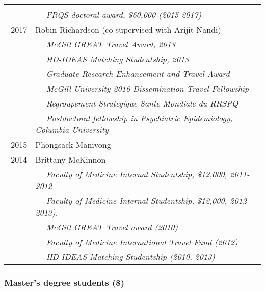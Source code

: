 \documentclass[
  letterpaper,
  DIV=11,
  numbers=noendperiod]{scrartcl}
\begin{document}
\begin{longtable}[]{@{}
  >{\raggedright\arraybackslash}p{}
  >{\raggedright\arraybackslash}p{}@{}}
{\$21,000} \\
& ~~ \emph{FRQS doctoral award, \$60,000 (2015-2017)} \\
2013-2017 & Robin Richardson (co-supervised with Arijit Nandi) \\
& ~~ \emph{McGill GREAT Travel Award, 2013} \\
& ~~ \emph{HD-IDEAS Matching Studentship, 2013} \\
& ~~ \emph{Graduate Research Enhancement and Travel Award} \\
& ~~ \emph{McGill University 2016 Dissemination Travel Fellowship } \\
& ~~ \emph{Regroupement Strategique Sante Mondiale du RRSPQ} \\
& ~~ \emph{Postdoctoral fellowship in Psychiatric Epidemiology, Columbia
University} \\
2011-2015 & Phongsack Manivong \\
2009-2014 & Brittany McKinnon \\
& ~~ \emph{Faculty of Medicine Internal Studentship, \$12,000,
2011-2012} \\
& ~~ \emph{Faculty of Medicine Internal Studentship, \$12,000,
2012-2013).} \\
& ~~ \emph{McGill GREAT Travel award (2010)} \\
& ~~ \emph{Faculty of Medicine International Travel Fund (2012)} \\
& ~~ \emph{HD-IDEAS Matching Studentship (2010, 2013)} \\
\end{longtable}

\hypertarget{masters-degree-students-8}{%
\subsubsection{Master's degree students
(8)}\label{masters-degree-students-8}}
\end{document}
